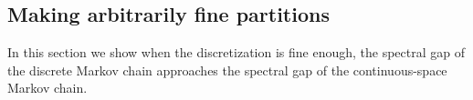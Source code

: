 \subsection{Making arbitrarily fine partitions}
\label{subsec:finepartition}
%
%

In this section we show when the discretization is fine enough, the spectral gap of the discrete Markov chain approaches the spectral gap of the continuous-space Markov chain.

